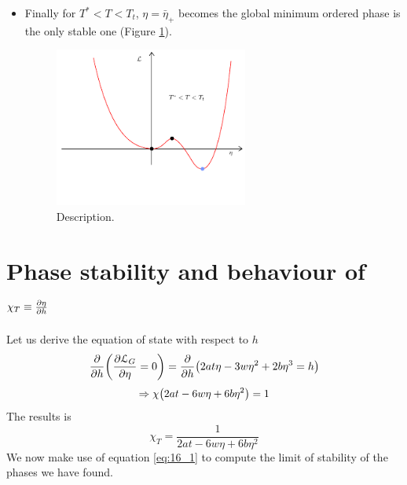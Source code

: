 \documentclass[../main/main.tex]{subfiles}
\begin{document}
\begin{itemize}
\begin{itemize}
\item Finally for \( T^* < T < T_t \), \( \eta = \bar{\eta }_+  \) becomes the global minimum ordered phase is the only stable one (Figure \ref{fig:16_5}).
\begin{figure}[h!]
\centering
\includegraphics[width=0.6\textwidth]{../lessons/16_image/5.pdf}
\caption{\label{fig:16_5} Description.}
\end{figure}
\end{itemize}
\end{itemize}


\section{Phase stability and behaviour of \( \chi _T \equiv \pdv{\eta }{h}  \)}

Let us derive the equation of state with respect to \( h \)
\begin{equation}
  \pdv{}{h} \qty(\pdv{\mathcal{L}_G}{\eta } = 0 )   = \pdv{}{h} \qty(2 a t \eta - 3 w \eta ^2 + 2 b \eta ^3 = h)
\end{equation}
\begin{equation}
  \Rightarrow \chi \qty(2 a t - 6 w \eta + 6 b \eta ^2 ) =1
\end{equation}
The results is
\begin{equation}
  \chi _T = \frac{1}{2 a t - 6 w \eta + 6 b \eta ^2}
  \label{eq:16_1}
\end{equation}
We now make use of equation \eqref{eq:16_1} to compute the limit of stability of the phases we have found.
\end{document}
